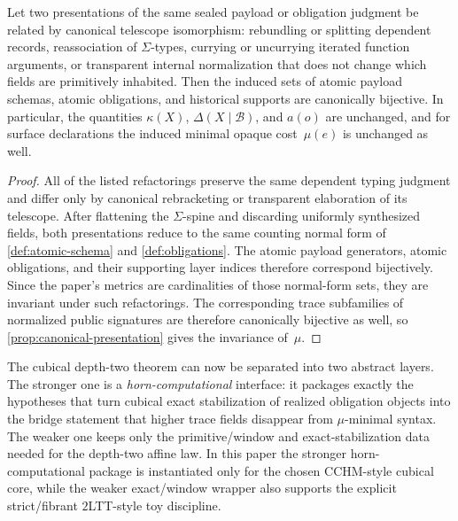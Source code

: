 \documentclass{lmcs}
\newcommand{\B}{\mathcal{B}}
\begin{document}
\begin{cor}
\label{cor:refactoring}
Let two presentations of the same sealed payload or obligation judgment be related by canonical telescope isomorphism: rebundling or splitting dependent records, reassociation of $\Sigma$-types, currying or uncurrying iterated function arguments, or transparent internal normalization that does not change which fields are primitively inhabited. Then the induced sets of atomic payload schemas, atomic obligations, and historical supports are canonically bijective. In particular, the quantities $\kappa(X)$, $\Delta(X \mid \B)$, and $a(o)$ are unchanged, and for surface declarations the induced minimal opaque cost~$\mu(e)$ is unchanged as well.
\end{cor}

\begin{proof}
All of the listed refactorings preserve the same dependent typing judgment and differ only by canonical rebracketing or transparent elaboration of its telescope. After flattening the $\Sigma$-spine and discarding uniformly synthesized fields, both presentations reduce to the same counting normal form of \autoref{def:atomic-schema} and \autoref{def:obligations}. The atomic payload generators, atomic obligations, and their supporting layer indices therefore correspond bijectively. Since the paper's metrics are cardinalities of those normal-form sets, they are invariant under such refactorings. The corresponding trace subfamilies of normalized public signatures are therefore canonically bijective as well, so \autoref{prop:canonical-presentation} gives the invariance of~$\mu$.
\end{proof}

The cubical depth-two theorem can now be separated into two abstract layers. The stronger one is a \emph{horn-computational} interface: it packages exactly the hypotheses that turn cubical exact stabilization of realized obligation objects into the bridge statement that higher trace fields disappear from $\mu$-minimal syntax. The weaker one keeps only the primitive/window and exact-stabilization data needed for the depth-two affine law. In this paper the stronger horn-computational package is instantiated only for the chosen CCHM-style cubical core, while the weaker exact/window wrapper also supports the explicit strict/fibrant $2$LTT-style toy discipline.
\end{document}
